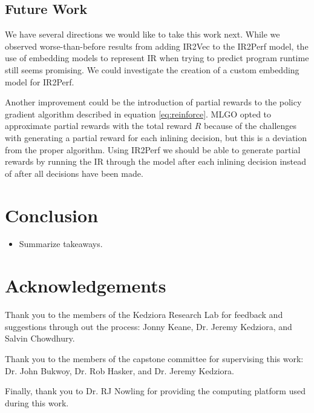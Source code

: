 \documentclass[nohyperref]{article}
\theoremstyle{plain}
\theoremstyle{definition}
\theoremstyle{remark}
\begin{document}
\subsection{Future Work}
We have several directions we would like to take this work next. While we observed worse-than-before results from adding IR2Vec to the IR2Perf model, the use of embedding models to represent IR when trying to predict program runtime still seems promising. We could investigate the creation of a custom embedding model for IR2Perf.

Another improvement could be the introduction of partial rewards to the policy gradient algorithm described in equation \ref{eq:reinforce}. MLGO opted to approximate partial rewards with the total reward $R$ because of the challenges with generating a partial reward for each inlining decision, but this is a deviation from the proper algorithm. Using IR2Perf we should be able to generate partial rewards by running the IR through the model after each inlining decision instead of after all decisions have been made.

\section{Conclusion}
\label{conclusion}
\begin{itemize}
\item Summarize takeaways\@.
\end{itemize}


\section*{Acknowledgements}

Thank you to the members of the Kedziora Research Lab for feedback and suggestions through out the process: Jonny Keane, Dr. Jeremy Kedziora, and Salvin Chowdhury.

Thank you to the members of the capstone committee for supervising this work: Dr. John Bukwoy, Dr. Rob Hasker, and Dr. Jeremy Kedziora.

Finally, thank you to Dr. RJ Nowling for providing the computing platform used during this work.

\nocite{langley00}



\end{document}
